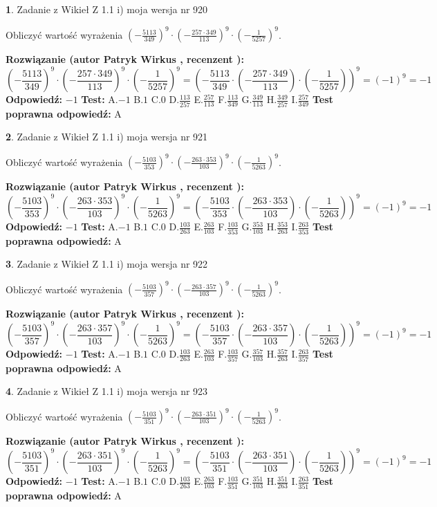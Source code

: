 \documentclass[12pt, a4paper]{article}
\theoremstyle{definition} %
\newtheorem{zad}{}
\newcommand{\zadStart}[1]{\begin{zad}#1\newline}
\newcommand{\zadStop}{\end{zad}}
\newcommand{\rozwStart}[2]{\noindent \textbf{Rozwiązanie (autor #1 , recenzent #2): }\newline}
\newcommand{\rozwStop}{\newline}
\newcommand{\odpStart}{\noindent \textbf{Odpowiedź:}\newline}
\newcommand{\odpStop}{\newline}
\newcommand{\testStart}{\noindent \textbf{Test:}\newline}
\newcommand{\testStop}{\newline}
\newcommand{\kluczStart}{\noindent \textbf{Test poprawna odpowiedź:}\newline}
\newcommand{\kluczStop}{\newline}
\begin{document}
\zadStart{Zadanie z Wikieł Z 1.1 i) moja wersja nr 920}

Obliczyć wartość wyrażenia $(-\frac{5113}{349})^{9} \cdot (-\frac{257 \cdot 349}{113})^{9} \cdot (-\frac{1}{5257})^{9}$.
\zadStop
\rozwStart{Patryk Wirkus}{}
$$(-\frac{5113}{349})^{9} \cdot (-\frac{257 \cdot 349}{113})^{9} \cdot (-\frac{1}{5257})^{9} = (-\frac{5113}{349} \cdot (-\frac{257 \cdot 349}{113}) \cdot (-\frac{1}{5257}))^{9} = (-1)^{9} = -1$$
\rozwStop
\odpStart
$-1$
\odpStop
\testStart
A.$-1$ B.$1$ C.$0$ D.$\frac{113}{257}$ E.$\frac{257}{113}$
F.$\frac{113}{349}$ G.$\frac{349}{113}$
H.$\frac{349}{257}$
I.$\frac{257}{349}$
\testStop
\kluczStart
A
\kluczStop



\zadStart{Zadanie z Wikieł Z 1.1 i) moja wersja nr 921}

Obliczyć wartość wyrażenia $(-\frac{5103}{353})^{9} \cdot (-\frac{263 \cdot 353}{103})^{9} \cdot (-\frac{1}{5263})^{9}$.
\zadStop
\rozwStart{Patryk Wirkus}{}
$$(-\frac{5103}{353})^{9} \cdot (-\frac{263 \cdot 353}{103})^{9} \cdot (-\frac{1}{5263})^{9} = (-\frac{5103}{353} \cdot (-\frac{263 \cdot 353}{103}) \cdot (-\frac{1}{5263}))^{9} = (-1)^{9} = -1$$
\rozwStop
\odpStart
$-1$
\odpStop
\testStart
A.$-1$ B.$1$ C.$0$ D.$\frac{103}{263}$ E.$\frac{263}{103}$
F.$\frac{103}{353}$ G.$\frac{353}{103}$
H.$\frac{353}{263}$
I.$\frac{263}{353}$
\testStop
\kluczStart
A
\kluczStop



\zadStart{Zadanie z Wikieł Z 1.1 i) moja wersja nr 922}

Obliczyć wartość wyrażenia $(-\frac{5103}{357})^{9} \cdot (-\frac{263 \cdot 357}{103})^{9} \cdot (-\frac{1}{5263})^{9}$.
\zadStop
\rozwStart{Patryk Wirkus}{}
$$(-\frac{5103}{357})^{9} \cdot (-\frac{263 \cdot 357}{103})^{9} \cdot (-\frac{1}{5263})^{9} = (-\frac{5103}{357} \cdot (-\frac{263 \cdot 357}{103}) \cdot (-\frac{1}{5263}))^{9} = (-1)^{9} = -1$$
\rozwStop
\odpStart
$-1$
\odpStop
\testStart
A.$-1$ B.$1$ C.$0$ D.$\frac{103}{263}$ E.$\frac{263}{103}$
F.$\frac{103}{357}$ G.$\frac{357}{103}$
H.$\frac{357}{263}$
I.$\frac{263}{357}$
\testStop
\kluczStart
A
\kluczStop



\zadStart{Zadanie z Wikieł Z 1.1 i) moja wersja nr 923}

Obliczyć wartość wyrażenia $(-\frac{5103}{351})^{9} \cdot (-\frac{263 \cdot 351}{103})^{9} \cdot (-\frac{1}{5263})^{9}$.
\zadStop
\rozwStart{Patryk Wirkus}{}
$$(-\frac{5103}{351})^{9} \cdot (-\frac{263 \cdot 351}{103})^{9} \cdot (-\frac{1}{5263})^{9} = (-\frac{5103}{351} \cdot (-\frac{263 \cdot 351}{103}) \cdot (-\frac{1}{5263}))^{9} = (-1)^{9} = -1$$
\rozwStop
\odpStart
$-1$
\odpStop
\testStart
A.$-1$ B.$1$ C.$0$ D.$\frac{103}{263}$ E.$\frac{263}{103}$
F.$\frac{103}{351}$ G.$\frac{351}{103}$
H.$\frac{351}{263}$
I.$\frac{263}{351}$
\testStop
\kluczStart
A
\kluczStop
\end{document}
